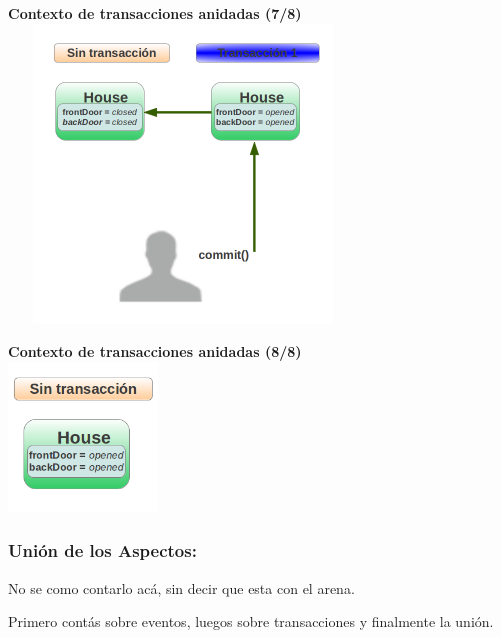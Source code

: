 	{\bf Contexto de transacciones anidadas (7/8)}\\
	\includegraphics[width=350px, height=300px]{img/contextoAninado7}

	{\bf Contexto de transacciones anidadas (8/8)}\\
	\includegraphics[width=150px, height=150px]{img/contextoAninado8}
	
\subsubsection{Unión de los Aspectos:}
No se como contarlo acá, sin decir que esta con el arena. 
	


Primero contás sobre eventos, luegos sobre transacciones y finalmente la unión.
